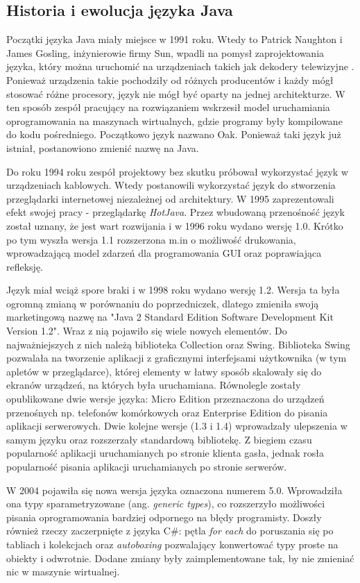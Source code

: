 \subsection{Historia i ewolucja języka Java}
Początki języka Java miały miejsce w 1991 roku. Wtedy to Patrick Naughton i James Gosling, inżynierowie firmy Sun,  wpadli na pomysł zaprojektowania języka, który  można uruchomić na urządzeniach takich jak dekodery telewizyjne \cite{java8}. Ponieważ urządzenia takie pochodziły od różnych producentów i każdy mógł stosować różne procesory, język nie mógł być oparty na jednej architekturze. W ten sposób zespół pracujący na rozwiązaniem wskrzesił model uruchamiania oprogramowania na maszynach wirtualnych, gdzie programy były kompilowane do kodu pośredniego.  
Początkowo język nazwano Oak. Ponieważ taki język już istniał, postanowiono zmienić nazwę na Java.

Do roku 1994 roku zespół projektowy bez skutku próbował wykorzystać język w urządzeniach kablowych. Wtedy postanowili wykorzystać język do stworzenia przeglądarki internetowej niezależnej od architektury. W 1995 zaprezentowali efekt swojej pracy - przeglądarkę \textsl{HotJava}. Przez wbudowaną przenośność język został uznany, że jest wart rozwijania i w 1996 roku wydano wersję 1.0. Krótko po tym wyszła wersja 1.1 rozszerzona m.in o możliwość drukowania, wprowadzającą model zdarzeń dla programowania GUI oraz poprawiająca refleksję.

Język miał wciąż spore braki i w 1998 roku wydano wersję 1.2. Wersja ta była ogromną zmianą w porównaniu do poprzedniczek, dlatego zmieniła swoją marketingową nazwę na "Java 2 Standard Edition Software Development Kit Version 1.2". Wraz z nią pojawiło się wiele nowych elementów. Do najważniejszych z nich należą biblioteka Collection oraz Swing. Biblioteka Swing pozwalała na tworzenie aplikacji z graficznymi interfejsami użytkownika (w tym apletów w przeglądarce), której elementy w łatwy sposób skalowały się do ekranów urządzeń, na których była uruchamiana. Równolegle zostały opublikowane dwie wersje języka: Micro Edition przeznaczona do urządzeń przenośnych np. telefonów komórkowych oraz Enterprise Edition do pisania aplikacji serwerowych. Dwie kolejne wersje (1.3 i 1.4) wprowadzały ulepszenia w samym języku oraz rozszerzały standardową bibliotekę. Z biegiem czasu popularność aplikacji uruchamianych po stronie klienta gasła, jednak rosła popularność pisania aplikacji uruchamianych po stronie serwerów.

W 2004 pojawiła się nowa wersja języka oznaczona numerem 5.0. Wprowadziła ona typy sparametryzowane (ang. \textsl{generic types}), co rozszerzyło możliwości pisania oprogramowania bardziej odpornego na błędy programisty. Doszły również rzeczy zaczerpnięte z języka C\#: pętla \textsl{for each} do poruszania się po tabliach i kolekcjach oraz \textsl{autoboxing} pozwalający konwertować typy proste na obiekty i odwrotnie. Dodane zmiany były zaimplementowane tak, by nie zmieniać nic w maszynie wirtualnej.

